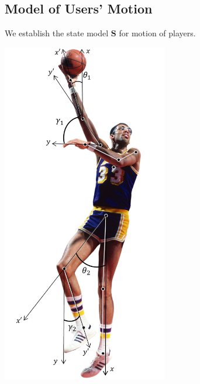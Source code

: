 \documentclass[12pt]{article}
\begin{document}
    \subsection{Model of Users' Motion}
    We establish the state model $\bm{S}$ for motion of players. \par
    \begin{minipage}[b]{0.50\linewidth}
        \includegraphics[height=15cm]{Hook Skeleton.png}
        \end{minipage}
\end{document}
